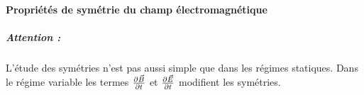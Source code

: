 \documentclass[11pt,a4paper,french]{article}
\begin{document}
\paragraph{Propriétés de symétrie du champ électromagnétique}
\subparagraph{Attention : }
L'étude des symétries n'est pas aussi simple que dans les régimes statiques.
Dans le régime variable les termes $\partial \vec B \over \partial t$ et $\partial \vec E \over \partial t$ modifient les symétries.
\end{document}

